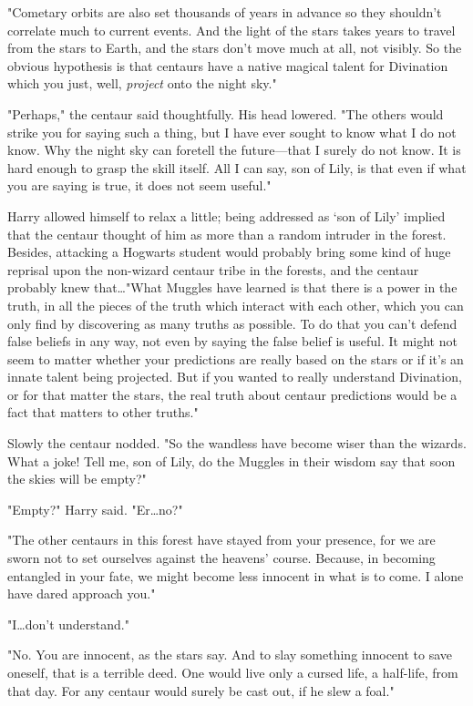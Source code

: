 "Cometary orbits are also set thousands of years in advance so they shouldn't
correlate much to current events. And the light of the stars takes years to
travel from the stars to Earth, and the stars don't move much at all, not
visibly. So the obvious hypothesis is that centaurs have a native magical
talent for Divination which you just, well, \emph{project} onto the night sky."

"Perhaps," the centaur said thoughtfully. His head lowered. "The others would
strike you for saying such a thing, but I have ever sought to know what I do
not know. Why the night sky can foretell the future---that I surely do not
know. It is hard enough to grasp the skill itself. All I can say, son of Lily,
is that even if what you are saying is true, it does not seem useful."

Harry allowed himself to relax a little; being addressed as `son of Lily'
implied that the centaur thought of him as more than a random intruder in the
forest. Besides, attacking a Hogwarts student would probably bring some kind of
huge reprisal upon the non-wizard centaur tribe in the forests, and the centaur
probably knew that…"What Muggles have learned is that there is a power
in the truth, in all the pieces of the truth which interact with each other,
which you can only find by discovering as many truths as possible. To do that
you can't defend false beliefs in any way, not even by saying the false belief
is useful. It might not seem to matter whether your predictions are really
based on the stars or if it's an innate talent being projected. But if you
wanted to really understand Divination, or for that matter the stars, the real
truth about centaur predictions would be a fact that matters to other truths."

Slowly the centaur nodded. "So the wandless have become wiser than the wizards.
What a joke! Tell me, son of Lily, do the Muggles in their wisdom say that soon
the skies will be empty?"

"Empty?" Harry said. "Er…no?"

"The other centaurs in this forest have stayed from your presence, for we are
sworn not to set ourselves against the heavens' course. Because, in becoming
entangled in your fate, we might become less innocent in what is to come. I
alone have dared approach you."

"I…don't understand."

"No. You are innocent, as the stars say. And to slay something innocent to save
oneself, that is a terrible deed. One would live only a cursed life, a
half-life, from that day. For any centaur would surely be cast out, if he slew
a foal."

